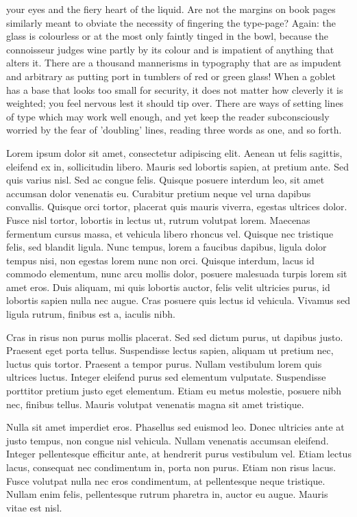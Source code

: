 your eyes and the fiery heart of the liquid. Are not the margins on book pages similarly
meant to obviate the necessity of fingering the type-page? Again: the glass is colourless or at
the most only faintly tinged in the bowl, because the connoisseur judges wine partly by its
colour and is impatient of anything that alters it. There are a thousand mannerisms in
typography that are as impudent and arbitrary as putting port in tumblers of red or green
glass! When a goblet has a base that looks too small for security, it does not matter how
cleverly it is weighted; you feel nervous lest it should tip over. There are ways of setting
lines of type which may work well enough, and yet keep the reader subconsciously worried
by the fear of 'doubling' lines, reading three words as one, and so forth.

Lorem ipsum dolor sit amet, consectetur adipiscing elit. Aenean ut felis sagittis, eleifend ex in, sollicitudin libero. Mauris sed lobortis sapien, at pretium ante. Sed quis varius nisl. Sed ac congue felis. Quisque posuere interdum leo, sit amet accumsan dolor venenatis eu. Curabitur pretium neque vel urna dapibus convallis. Quisque orci tortor, placerat quis mauris viverra, egestas ultrices dolor. Fusce nisl tortor, lobortis in lectus ut, rutrum volutpat lorem. Maecenas fermentum cursus massa, et vehicula libero rhoncus vel. Quisque nec tristique felis, sed blandit ligula. Nunc tempus, lorem a faucibus dapibus, ligula dolor tempus nisi, non egestas lorem nunc non orci. Quisque interdum, lacus id commodo elementum, nunc arcu mollis dolor, posuere malesuada turpis lorem sit amet eros. Duis aliquam, mi quis lobortis auctor, felis velit ultricies purus, id lobortis sapien nulla nec augue. Cras posuere quis lectus id vehicula. Vivamus sed ligula rutrum, finibus est a, iaculis nibh.

Cras in risus non purus mollis placerat. Sed sed dictum purus, ut dapibus justo. Praesent eget porta tellus. Suspendisse lectus sapien, aliquam ut pretium nec, luctus quis tortor. Praesent a tempor purus. Nullam vestibulum lorem quis ultrices luctus. Integer eleifend purus sed elementum vulputate. Suspendisse porttitor pretium justo eget elementum. Etiam eu metus molestie, posuere nibh nec, finibus tellus. Mauris volutpat venenatis magna sit amet tristique.

Nulla sit amet imperdiet eros. Phasellus sed euismod leo. Donec ultricies ante at justo tempus, non congue nisl vehicula. Nullam venenatis accumsan eleifend. Integer pellentesque efficitur ante, at hendrerit purus vestibulum vel. Etiam lectus lacus, consequat nec condimentum in, porta non purus. Etiam non risus lacus. Fusce volutpat nulla nec eros condimentum, at pellentesque neque tristique. Nullam enim felis, pellentesque rutrum pharetra in, auctor eu augue. Mauris vitae est nisl.

